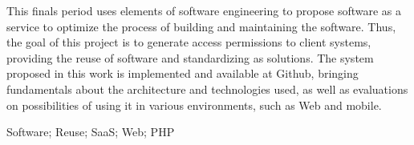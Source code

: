 This finals period uses elements of software engineering to propose software as a service to optimize the process of building and maintaining the software. Thus, the goal of this project is to generate access permissions to client systems, providing the reuse of software and standardizing as solutions. The system proposed in this work is implemented and available at Github, bringing fundamentals about the architecture and technologies used, as well as evaluations on possibilities of using it in various environments, such as Web and mobile.

\begin{keywords}
Software; Reuse; SaaS; Web; PHP
\end{keywords}